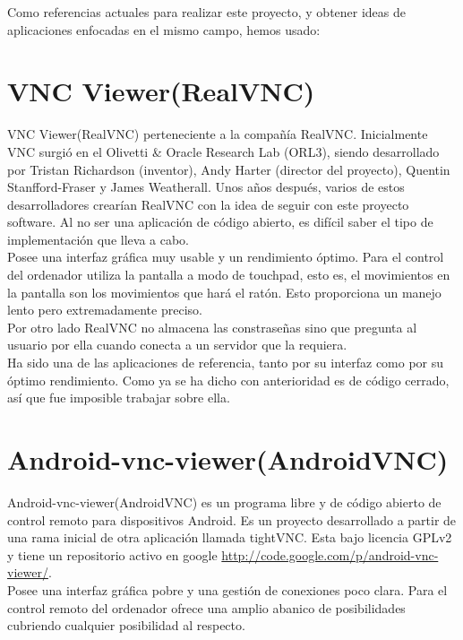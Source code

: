Como referencias actuales para realizar este proyecto, y obtener ideas de aplicaciones enfocadas en el mismo campo, hemos usado:
\section{VNC Viewer(RealVNC)}
VNC Viewer(RealVNC)\cite{wiki:realvnc} perteneciente a la compañía RealVNC. Inicialmente VNC surgió en el Olivetti \& Oracle Research Lab (ORL3), siendo desarrollado por Tristan Richardson (inventor), Andy Harter (director del proyecto), Quentin Stanfford-Fraser y James Weatherall. Unos años después, varios de estos desarrolladores crearían RealVNC con la idea de seguir con este proyecto software. Al no ser una aplicación de código abierto, es difícil saber el tipo de implementación que lleva a cabo.\\

Posee una interfaz gráfica muy usable y un rendimiento óptimo. Para el control del ordenador utiliza la pantalla a modo de touchpad, esto es, el movimientos en la pantalla son los movimientos que hará el ratón. Esto proporciona un manejo lento pero extremadamente preciso.\\

Por otro lado RealVNC no almacena las constraseñas sino que pregunta al usuario por ella cuando conecta a un servidor que la requiera.\\

Ha sido una de las aplicaciones de referencia, tanto por su interfaz como por su óptimo rendimiento. Como ya se ha dicho con anterioridad es de código cerrado, así que fue imposible trabajar sobre ella.
\newpage
\section{Android-vnc-viewer(AndroidVNC)}
Android-vnc-viewer(AndroidVNC)\cite{androidvnc:androidvnc} es un programa libre y de código abierto de control remoto para dispositivos Android. Es un proyecto desarrollado a partir de una rama inicial de otra aplicación llamada tightVNC. Esta bajo licencia GPLv2 y tiene un repositorio activo en google \url{http://code.google.com/p/android-vnc-viewer/}.\\

Posee una interfaz gráfica pobre y una gestión de conexiones poco clara. Para el control remoto del ordenador ofrece una amplio abanico de posibilidades cubriendo cualquier posibilidad al respecto.\\

